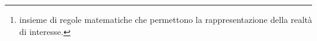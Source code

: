 \begin{abstract}

\textit{Che cos'è la Fisica?}
Fisica deriva dal greco \textit{ph\'ysi} che significa natura, è la scienza che studia tutti i fenomeni naturali che possono essere quantificati o misurati mediante il metodo scientifico, storicamente attribuito all'italiano \textit{Galileo Galilei}, attraverso il quale si possono creare dei \textit{modelli} \footnote{insieme di regole matematiche che permettono la rappresentazione della realtà di interesse.} che descrivono il fenomeno studiato.





\end{abstract}